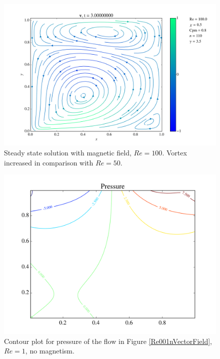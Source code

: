 \documentclass[journal]{IEEEtran}
\begin{document}
\begin{figure}[!t]
\centering
\includegraphics[width=\linewidth]{figures/Re100/w/vectorField}
\caption{Steady state solution with magnetic field, $\mathit{Re}=100$. Vortex increased in comparison with $\mathit{Re} = 50$. \label{Re100wVectorField}}
\end{figure}


\begin{figure}[!t]
\centering
\includegraphics[width=\linewidth]{figures/Re001/n/pressure}
\caption{Contour plot for pressure of the flow in Figure \ref{Re001nVectorField}, $\mathit{Re}=1$, no magnetism. \label{Re001nPressure}}
\end{figure}
\end{document}
